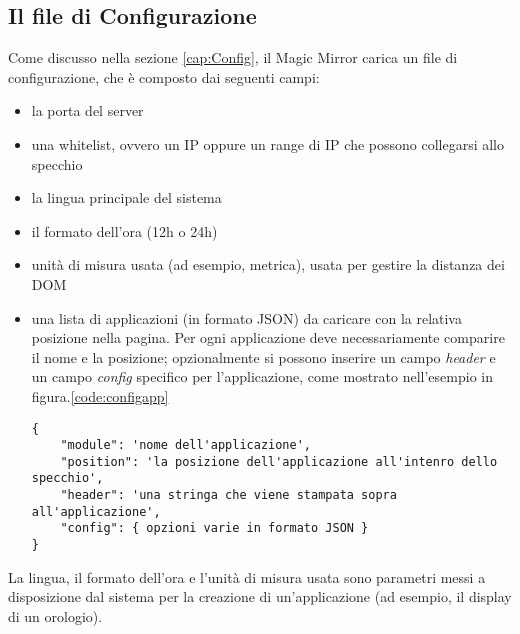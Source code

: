\subsection{Il file di Configurazione}
Come discusso nella sezione \ref{cap:Config}, il Magic Mirror carica un file di configurazione, che è composto dai seguenti campi:
\begin{itemize}
\item la porta del server
\item una whitelist, ovvero un IP oppure un range di IP che possono collegarsi allo specchio
\item la lingua principale del sistema
\item il formato dell'ora (12h o 24h)
\item unit\`a di misura usata (ad esempio, metrica), usata per gestire la distanza dei DOM
\item una lista di applicazioni (in formato JSON) da caricare con la relativa posizione nella pagina. Per ogni applicazione deve necessariamente comparire il
nome e la posizione; opzionalmente si possono inserire un campo  \textit{header} e un campo \textit{config} specifico per l'applicazione, come mostrato
nell'esempio in figura.\ref{code:configapp}
\begin{lstlisting}[label={code:configapp}]
{
	"module": 'nome dell'applicazione',
	"position": 'la posizione dell'applicazione all'intenro dello specchio',
	"header": 'una stringa che viene stampata sopra all'applicazione',
	"config": { opzioni varie in formato JSON }
}
\end{lstlisting}
\end{itemize}
La lingua, il formato dell'ora e l'unit\`a di misura usata sono parametri messi a disposizione dal sistema per la creazione di un'applicazione
(ad esempio, il display di un orologio).

